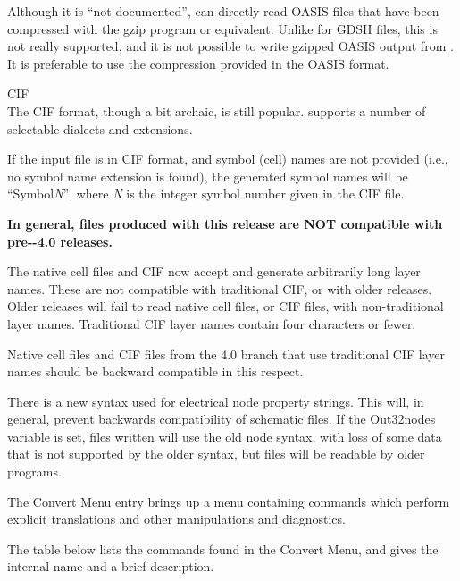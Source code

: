 \begin{description}
Although it is ``not documented'', {\Xic} can directly read OASIS
files that have been compressed with the {\vt gzip} program or
equivalent.  Unlike for GDSII files, this is not really supported,
and it is not possible to write gzipped OASIS output from {\Xic}.  It
is preferable to use the compression provided in the OASIS format.

\item{CIF}\\
The CIF format, though a bit archaic, is still popular.  {\Xic}
supports a number of selectable dialects and extensions.

If the input file is in CIF format, and symbol (cell) names are not
provided (i.e., no symbol name extension is found), the generated
symbol names will be ``{\vt Symbol}{\it N}'', where {\it N} is the
integer symbol number given in the CIF file.
\end{description}

{\bf In general, files produced with this {\Xic} release are NOT
compatible with pre-{\Xic}-4.0 releases.}

The native cell files and CIF now accept and generate arbitrarily long
layer names.  These are not compatible with traditional CIF, or with
older {\Xic} releases.  Older {\Xic} releases will fail to read native
cell files, or CIF files, with non-traditional layer names. 
Traditional CIF layer names contain four characters or fewer.

Native cell files and CIF files from the 4.0 branch that use
traditional CIF layer names should be backward compatible in this
respect.

There is a new syntax used for electrical {\et node} property strings. 
This will, in general, prevent backwards compatibility of schematic
files.  If the {\et Out32nodes} variable is set, files written will
use the old node syntax, with loss of some data that is not supported
by the older syntax, but files will be readable by older {\Xic}
programs.

The {\cb Convert Menu} entry brings up a menu containing commands
which perform explicit translations and other manipulations and
diagnostics.

The table below lists the commands found in the {\cb Convert Menu},
and gives the internal name and a brief description.

